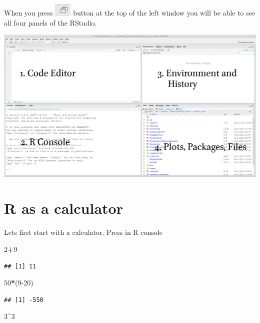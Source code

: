 \documentclass[
]{book}
\newenvironment{Shaded}{\begin{snugshade}}{\end{snugshade}}
\newcommand{\DecValTok}[1]{\textcolor[rgb]{0.00,0.00,0.81}{#1}}
\newcommand{\NormalTok}[1]{#1}
\newcommand{\OperatorTok}[1]{\textcolor[rgb]{0.81,0.36,0.00}{\textbf{#1}}}
\begin{document}
When you press \includegraphics{images/01.02.rstudio_button.png} button at the top of the left window you will be able to see all four panels of the RStudio.

\includegraphics{images/01.03.rstudio.png}

\hypertarget{r-as-a-calculator}{%
\section{R as a calculator}\label{r-as-a-calculator}}

Lets first start with a calculator. Press in R console

\begin{Shaded}
\begin{Highlighting}[]
\DecValTok{2}\OperatorTok{+}\DecValTok{9}
\end{Highlighting}
\end{Shaded}

\begin{verbatim}
## [1] 11
\end{verbatim}

\begin{Shaded}
\begin{Highlighting}[]
\DecValTok{50}\OperatorTok{*}\NormalTok{(}\DecValTok{9-20}\NormalTok{)}
\end{Highlighting}
\end{Shaded}

\begin{verbatim}
## [1] -550
\end{verbatim}

\begin{Shaded}
\begin{Highlighting}[]
\DecValTok{3}\OperatorTok{^}\DecValTok{3}
\end{Highlighting}
\end{Shaded}
\end{document}
